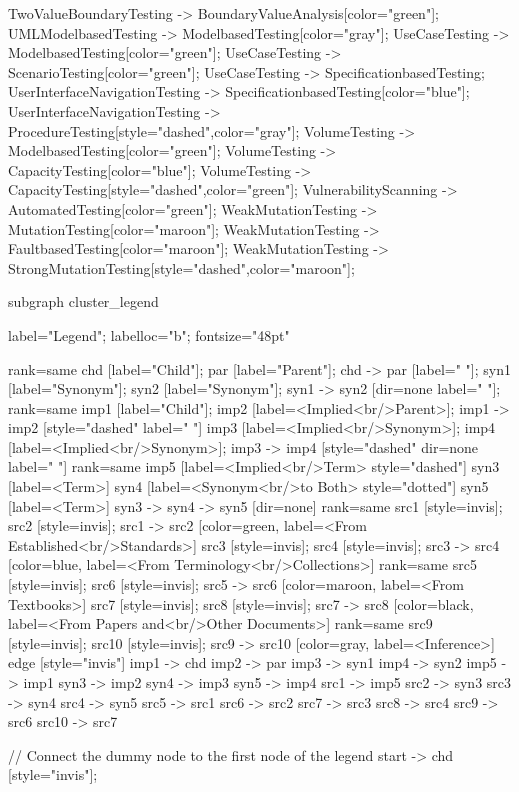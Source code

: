\documentclass{article}
\begin{document}
{TwoValueBoundaryTesting -> BoundaryValueAnalysis[color="green"];
UMLModelbasedTesting -> ModelbasedTesting[color="gray"];
UseCaseTesting -> ModelbasedTesting[color="green"];
UseCaseTesting -> ScenarioTesting[color="green"];
UseCaseTesting -> SpecificationbasedTesting;
UserInterfaceNavigationTesting -> SpecificationbasedTesting[color="blue"];
UserInterfaceNavigationTesting -> ProcedureTesting[style="dashed",color="gray"];
VolumeTesting -> ModelbasedTesting[color="green"];
VolumeTesting -> CapacityTesting[color="blue"];
VolumeTesting -> CapacityTesting[style="dashed",color="green"];
VulnerabilityScanning -> AutomatedTesting[color="green"];
WeakMutationTesting -> MutationTesting[color="maroon"];
WeakMutationTesting -> FaultbasedTesting[color="maroon"];
WeakMutationTesting -> StrongMutationTesting[style="dashed",color="maroon"];

subgraph cluster_legend {

    label="Legend";
    labelloc="b";
    fontsize="48pt"

    {
        rank=same
        chd [label="Child"];
        par [label="Parent"];
        chd -> par [label="                "];
        syn1 [label="Synonym"];
        syn2 [label="Synonym"];
        syn1 -> syn2 [dir=none label="                "];
    }
    {
        rank=same
        imp1 [label="Child"];
        imp2 [label=<Implied<br/>Parent>];
        imp1 -> imp2 [style="dashed" label="                "]
        imp3 [label=<Implied<br/>Synonym>];
        imp4 [label=<Implied<br/>Synonym>];
        imp3 -> imp4 [style="dashed" dir=none label="                "]
    }
    {
        rank=same
        imp5 [label=<Implied<br/>Term> style="dashed"]
        syn3 [label=<Term>]
        syn4 [label=<Synonym<br/>to Both> style="dotted"]
        syn5 [label=<Term>]
        syn3 -> syn4 -> syn5 [dir=none]
    }
{
rank=same
src1 [style=invis];
src2 [style=invis];
src1 -> src2 [color=green, label=<From Established<br/>Standards>]
src3 [style=invis];
src4 [style=invis];
src3 -> src4 [color=blue, label=<From Terminology<br/>Collections>]
}
{
rank=same
src5 [style=invis];
src6 [style=invis];
src5 -> src6 [color=maroon, label=<From Textbooks>]
src7 [style=invis];
src8 [style=invis];
src7 -> src8 [color=black, label=<From Papers and<br/>Other Documents>]
}
{
rank=same
src9 [style=invis];
src10 [style=invis];
src9 -> src10 [color=gray, label=<Inference>]
}
edge [style="invis"]
imp1 -> chd
imp2 -> par
imp3 -> syn1
imp4 -> syn2
imp5 -> imp1
syn3 -> imp2
syn4 -> imp3
syn5 -> imp4
src1 -> imp5
src2 -> syn3
src3 -> syn4
src4 -> syn5
src5 -> src1
src6 -> src2
src7 -> src3
src8 -> src4
src9 -> src6
src10 -> src7
}

// Connect the dummy node to the first node of the legend
start -> chd [style="invis"];
}
\end{document}
